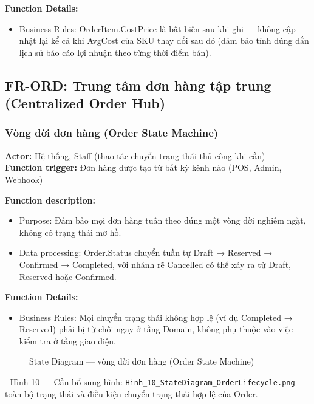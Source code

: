 \textbf{Function Details:}
\begin{itemize}
    \item Business Rules: OrderItem.CostPrice là bất biến sau khi ghi — không cập nhật lại kể cả khi AvgCost của SKU thay đổi sau đó (đảm bảo tính đúng đắn lịch sử báo cáo lợi nhuận theo từng thời điểm bán).
\end{itemize}

\subsection{FR-ORD: Trung tâm đơn hàng tập trung (Centralized Order Hub)}

\subsubsection{Vòng đời đơn hàng (Order State Machine)}
\textbf{Actor:} Hệ thống, Staff (thao tác chuyển trạng thái thủ công khi cần) \\
\textbf{Function trigger:} Đơn hàng được tạo từ bất kỳ kênh nào (POS, Admin, Webhook)

\textbf{Function description:}
\begin{itemize}
    \item Purpose: Đảm bảo mọi đơn hàng tuân theo đúng một vòng đời nghiêm ngặt, không có trạng thái mơ hồ.
    \item Data processing: Order.Status chuyển tuần tự Draft → Reserved → Confirmed → Completed, với nhánh rẽ Cancelled có thể xảy ra từ Draft, Reserved hoặc Confirmed.
\end{itemize}

\textbf{Function Details:}
\begin{itemize}
    \item Business Rules: Mọi chuyển trạng thái không hợp lệ (ví dụ Completed → Reserved) phải bị từ chối ngay ở tầng Domain, không phụ thuộc vào việc kiểm tra ở tầng giao diện.
\end{itemize}

\begin{figure}[H]
    \centering
    \caption{State Diagram — vòng đời đơn hàng (Order State Machine)}
    \label{fig:state-order-lifecycle}
\end{figure}
\begin{imgnote}
📌 Hình 10 — Cần bổ sung hình: \texttt{Hinh\_10\_StateDiagram\_OrderLifecycle.png} — toàn bộ trạng thái và điều kiện chuyển trạng thái hợp lệ của Order.
\end{imgnote}

